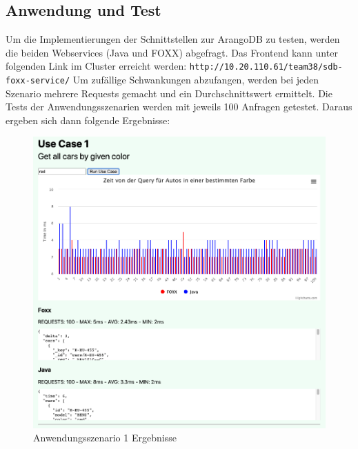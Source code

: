 \subsection{Anwendung und Test}
Um die Implementierungen der Schnittstellen zur ArangoDB zu testen, werden die beiden Webservices (Java und FOXX) abgefragt. Das Frontend kann unter folgenden Link im Cluster erreicht werden: \texttt{http://10.20.110.61/team38/sdb-foxx-service/} \newline
Um zufällige Schwankungen abzufangen, werden bei jeden Szenario mehrere Requests gemacht und ein Durchschnittswert ermittelt. Die Tests der Anwendungsszenarien werden mit jeweils 100 Anfragen getestet. Daraus ergeben sich dann folgende Ergebnisse:
\begin{figure}[htbp] 
  	\centering
     \includegraphics[width=1\textwidth]{./images/UseCase1.png}
 	\caption{Anwendungsszenario 1 Ergebnisse}
  \label{fig:DataSchema}
\end{figure}
